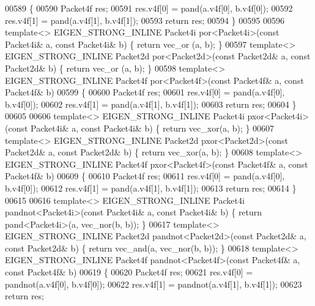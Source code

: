 \begin{DoxyCode}
{00589 \{
00590   Packet4f res;
00591   res.v4f[0] = pand(a.v4f[0], b.v4f[0]);
00592   res.v4f[1] = pand(a.v4f[1], b.v4f[1]);
00593   \textcolor{keywordflow}{return} res;
00594 \}
00595 
00596 \textcolor{keyword}{template}<> EIGEN\_STRONG\_INLINE Packet4i por<Packet4i>(\textcolor{keyword}{const} Packet4i& a, \textcolor{keyword}{const} Packet4i& b) \{ \textcolor{keywordflow}{return} vec\_or
      (a, b); \}
00597 \textcolor{keyword}{template}<> EIGEN\_STRONG\_INLINE Packet2d por<Packet2d>(\textcolor{keyword}{const} Packet2d& a, \textcolor{keyword}{const} Packet2d& b) \{ \textcolor{keywordflow}{return} vec\_or
      (a, b); \}
00598 \textcolor{keyword}{template}<> EIGEN\_STRONG\_INLINE Packet4f por<Packet4f>(\textcolor{keyword}{const} Packet4f& a, \textcolor{keyword}{const} Packet4f& b)
00599 \{
00600   Packet4f res;
00601   res.v4f[0] = pand(a.v4f[0], b.v4f[0]);
00602   res.v4f[1] = pand(a.v4f[1], b.v4f[1]);
00603   \textcolor{keywordflow}{return} res;
00604 \}
00605 
00606 \textcolor{keyword}{template}<> EIGEN\_STRONG\_INLINE Packet4i pxor<Packet4i>(\textcolor{keyword}{const} Packet4i& a, \textcolor{keyword}{const} Packet4i& b) \{ \textcolor{keywordflow}{return} 
      vec\_xor(a, b); \}
00607 \textcolor{keyword}{template}<> EIGEN\_STRONG\_INLINE Packet2d pxor<Packet2d>(\textcolor{keyword}{const} Packet2d& a, \textcolor{keyword}{const} Packet2d& b) \{ \textcolor{keywordflow}{return} 
      vec\_xor(a, b); \}
00608 \textcolor{keyword}{template}<> EIGEN\_STRONG\_INLINE Packet4f pxor<Packet4f>(\textcolor{keyword}{const} Packet4f& a, \textcolor{keyword}{const} Packet4f& b)
00609 \{
00610   Packet4f res;
00611   res.v4f[0] = pand(a.v4f[0], b.v4f[0]);
00612   res.v4f[1] = pand(a.v4f[1], b.v4f[1]);
00613   \textcolor{keywordflow}{return} res;
00614 \}
00615 
00616 \textcolor{keyword}{template}<> EIGEN\_STRONG\_INLINE Packet4i pandnot<Packet4i>(\textcolor{keyword}{const} Packet4i& a, \textcolor{keyword}{const} Packet4i& b) \{ \textcolor{keywordflow}{return} 
      pand<Packet4i>(a, vec\_nor(b, b)); \}
00617 \textcolor{keyword}{template}<> EIGEN\_STRONG\_INLINE Packet2d pandnot<Packet2d>(\textcolor{keyword}{const} Packet2d& a, \textcolor{keyword}{const} Packet2d& b) \{ \textcolor{keywordflow}{return} 
      vec\_and(a, vec\_nor(b, b)); \}
00618 \textcolor{keyword}{template}<> EIGEN\_STRONG\_INLINE Packet4f pandnot<Packet4f>(\textcolor{keyword}{const} Packet4f& a, \textcolor{keyword}{const} Packet4f& b)
00619 \{
00620   Packet4f res;
00621   res.v4f[0] = pandnot(a.v4f[0], b.v4f[0]);
00622   res.v4f[1] = pandnot(a.v4f[1], b.v4f[1]);
00623   \textcolor{keywordflow}{return} res;
}
\end{DoxyCode}
